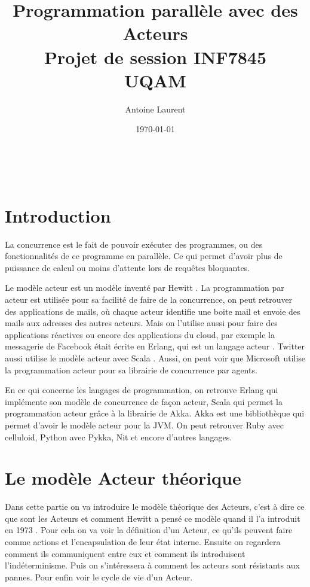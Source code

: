 \documentclass[11pt, a4paper]{article}
\title{Programmation parallèle avec des Acteurs \\ \large{Projet de session INF7845 \\ UQAM}}
\date{\today}
\author{Antoine Laurent}
\begin{document}
\maketitle\thispagestyle{empty}
\newpage 
\tableofcontents
\listoffigures
\newpage
\
\section{Introduction}
La concurrence est le fait de pouvoir exécuter des programmes, ou des fonctionnalités de ce programme en parallèle. Ce qui permet d'avoir plus de puissance de calcul ou moins d'attente lors de requêtes bloquantes.
\par Le modèle acteur est un modèle inventé par Hewitt \cite{hewitt1973session}. La programmation par acteur est utilisée pour sa facilité de faire de la concurrence, on peut retrouver des applications de mails, où chaque acteur identifie une boite mail et envoie des mails aux adresses des autres acteurs. Mais on l'utilise aussi pour faire des applications réactives ou encore des applications du cloud, par exemple la messagerie de Facebook était écrite en Erlang, qui est un langage acteur \cite{agha2014actors}. Twitter aussi utilise le modèle acteur avec Scala \cite{twitter_concurency}. Aussi, on peut voir que Microsoft utilise la programmation acteur pour  sa librairie de concurrence par agents.\cite{micr_concurency}
\par En ce qui concerne les langages de programmation, on retrouve Erlang qui implémente son modèle de concurrence de façon acteur, Scala qui permet la programmation acteur grâce à la librairie de Akka. Akka est une bibliothèque qui permet d'avoir le modèle acteur pour la JVM. On peut retrouver Ruby avec celluloid, Python avec Pykka, Nit et encore d'autres langages.

\section{Le modèle Acteur théorique}

Dans cette partie on va introduire le modèle théorique des Acteurs, c'est à dire ce que sont les Acteurs et comment Hewitt a pensé ce modèle quand il l'a introduit en 1973 \cite{hewitt1973session}. Pour cela on va voir la définition d'un Acteur, ce qu'ils peuvent faire comme actions et l'encapsulation de leur état interne. Ensuite on regardera comment ils communiquent entre eux et comment ils introduisent l'indéterminisme. Puis on s'intéressera à comment les acteurs sont résistants aux pannes. Pour enfin voir le cycle de vie d'un Acteur.
\end{document}
